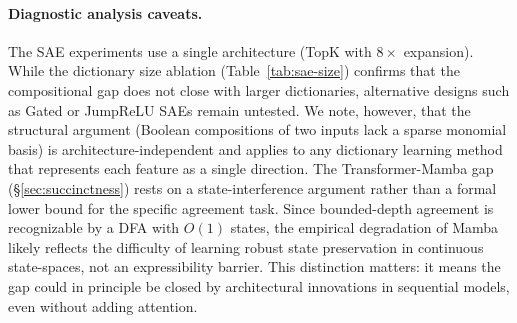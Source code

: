\documentclass[11pt]{article}
\begin{document}
\paragraph{Diagnostic analysis caveats.}
The SAE experiments use a single architecture (TopK with $8{\times}$ expansion).
While the dictionary size ablation (Table~\ref{tab:sae-size}) confirms that the compositional gap does not close with larger dictionaries, alternative designs such as Gated or JumpReLU SAEs remain untested.
We note, however, that the structural argument (Boolean compositions of two inputs lack a sparse monomial basis) is architecture-independent and applies to any dictionary learning method that represents each feature as a single direction.
The Transformer-Mamba gap (\S\ref{sec:succinctness}) rests on a state-interference argument rather than a formal lower bound for the specific agreement task.
Since bounded-depth agreement is recognizable by a DFA with $O(1)$ states, the empirical degradation of Mamba likely reflects the difficulty of learning robust state preservation in continuous state-spaces, not an expressibility barrier.
This distinction matters: it means the gap could in principle be closed by architectural innovations in sequential models, even without adding attention.



\appendix
\end{document}
